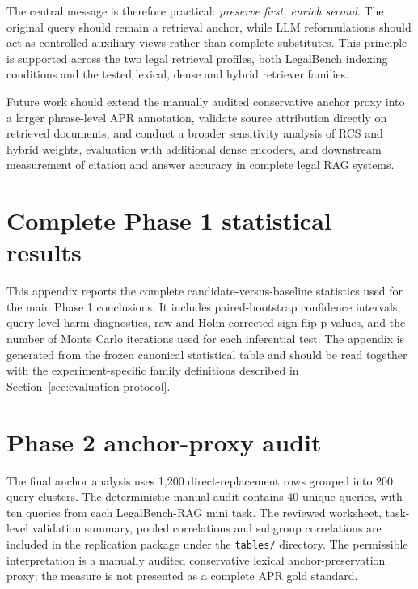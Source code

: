\documentclass[a4paper,fleqn]{cas-dc}
\begin{document}
The central message is therefore practical: \textit{preserve
first, enrich second}. The original query should remain a
retrieval anchor, while LLM reformulations should act as
controlled auxiliary views rather than complete substitutes.
This principle is supported across the two legal retrieval
profiles, both LegalBench indexing conditions and the tested
lexical, dense and hybrid retriever families.

Future work should extend the manually audited conservative anchor
proxy into a larger phrase-level APR annotation, validate source
attribution directly on retrieved documents, and conduct a broader
sensitivity analysis of RCS and hybrid weights, evaluation with
additional dense encoders, and downstream measurement of citation
and answer accuracy in complete legal RAG systems.


\clearpage
\onecolumn
\appendix
\section{Complete Phase 1 statistical results}
\label{app:phase1-statistics}

This appendix reports the complete candidate-versus-baseline
statistics used for the main Phase 1 conclusions. It includes
paired-bootstrap confidence intervals, query-level harm
diagnostics, raw and Holm-corrected sign-flip p-values, and the
number of Monte Carlo iterations used for each inferential test.
The appendix is generated from the frozen canonical statistical
table and should be read together with the experiment-specific
family definitions described in Section~\ref{sec:evaluation-protocol}.



\section{Phase 2 anchor-proxy audit}
\label{app:anchor-proxy-audit}

The final anchor analysis uses 1,200 direct-replacement rows grouped into
200 query clusters. The deterministic manual audit contains 40 unique
queries, with ten queries from each LegalBench-RAG mini task. The
reviewed worksheet, task-level validation summary, pooled correlations
and subgroup correlations are included in the replication package under
the \texttt{tables/} directory. The permissible interpretation is a
manually audited conservative lexical anchor-preservation proxy; the
measure is not presented as a complete APR gold standard.
\end{document}
